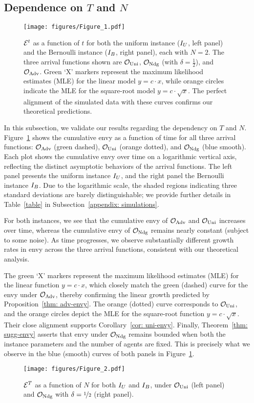 \subsection{Dependence on $T$ and $N$}\label{subsec:dep t n}
\begin{figure}
    \centering
    \texttt{[image: figures/Figure\_1.pdf]}
    \caption{
    $\mathcal{E}^t$ as a function of $t$ for both the uniform instance ($I_U$, left panel) and the Bernoulli instance ($I_B$, right panel), each with $N=2$. 
    The three arrival functions shown are $\mathcal O_{\textnormal{Uni}}$, $\mathcal O_{\textnormal{Ndg}}$ (with $\delta=\frac 1 2$), and $\mathcal O_{\textnormal{Adv}}$. Green `X' markers represent the maximum likelihood estimates (MLE) for the linear model $y = c \cdot x$, while orange circles indicate the MLE for the square-root model $y = c \cdot \sqrt{x}$. The perfect alignment of the simulated data with these curves confirms our theoretical predictions.}
    \label{fig: envy-func-t}
\end{figure}
In this subsection, we validate our results regarding the dependency on $T$ and $N$. Figure~\ref{fig: envy-func-t} shows the cumulative envy as a function of time for all three arrival functions: $\mathcal O_{\textnormal{Adv}}$ (green dashed), $\mathcal O_{\textnormal{Uni}}$ (orange dotted), and $\mathcal O_{\textnormal{Ndg}}$ (blue smooth). Each plot shows the cumulative envy over time on a logarithmic vertical axis, reflecting the distinct asymptotic behaviors of the arrival functions. The left panel presents the uniform instance $I_U$, and the right panel the Bernoulli instance $I_B$.  Due to the logarithmic scale, the shaded regions indicating three standard deviations are barely distinguishable; we provide further details in Table~\ref{table} in Subsection~\ref{appendix: simulations}.

For both instances, we see that the cumulative envy of $\mathcal O_{\textnormal{Adv}}$ and $\mathcal O_{\textnormal{Uni}}$ increases over time, whereas the cumulative envy of $\mathcal O_{\textnormal{Ndg}}$ remains nearly constant (subject to some noise). As time progresses, we observe substantially different growth rates in envy across the three arrival functions, consistent with our theoretical analysis. 

The green `X' markers represent the maximum likelihood estimates (MLE) for the linear function $y = c \cdot x$, which closely match the green (dashed) curve for the envy under $\mathcal O_{\textnormal{Adv}}$, thereby confirming the linear growth predicted by Proposition~\ref{thm: adv-envy}. The orange (dotted) curve corresponds to $\mathcal O_{\textnormal{Uni}}$, and the orange circles depict the MLE for the square-root function $y = c \cdot \sqrt{x}$. Their close alignment supports Corollary~\ref{cor: uni-envy}. Finally, Theorem~\ref{thm: sugg-envy} asserts that envy under $\mathcal O_{\textnormal{Ndg}}$ remains bounded when both the instance parameters and the number of agents are fixed. This is precisely what we observe in the blue (smooth) curves of both panels in Figure~\ref{fig: envy-func-t}.
\begin{figure}
    \centering
    \texttt{[image: figures/Figure\_2.pdf]}
    \caption{$\mathcal{E}^T$ as a function of $N$ for both $I_U$ and $I_B$, under $\mathcal O_{\textnormal{Uni}}$ (left panel) and $\mathcal O_{\textnormal{Ndg}}$ with $\delta=\nicefrac{1}{2}$ (right panel).}
    \label{fig: envy-T-func-N}
\end{figure}

